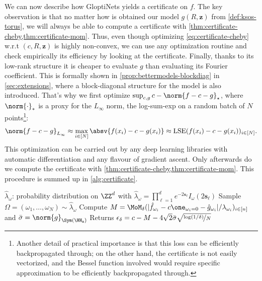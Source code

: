 \documentclass{article}
\begin{document}
We can now describe how GloptiNets yields a certificate on $f$. The key observation is that no matter how is obtained our model $g(R, \mathbf{z})$ from \cref{def:ksos-torus}, we will always be able to compute a certificate with \cref{thm:certificate-cheby,thm:certificate-mom}. Thus, even though optimizing \cref{eq:certificate-cheby} w.r.t $(c, R, \mathbf{z})$ is highly non-convex, we can use any optimization routine and check empirically its efficiency by looking at the certificate.
Finally, thanks to its low-rank structure it is cheaper to evaluate $g$ than evaluating its Fourier coefficient. This is formally shown in \cref{prop:bettermodels-blockdiag} in \cref{sec:extensions}, where a block-diagonal structure for the model is also introduced. That's why we first optimize $\sup_{c, g} c - \norm{f - c - g}_\star$, where $\norm{\cdot}_*$ is a proxy for the $L_\infty$ norm, \eg the log-sum-exp on a random batch of $N$ points\footnote{Another detail of practical importance is that this loss can be efficiently backpropagated through; on the other hand, the certificate is not easily vectorized, and the Bessel function involved would require specific approximation to be efficiently backpropagated through.}:
\begin{equation}
  \norm{f - c - g}_{L_\infty} \approx \max_{i \in [N]} \absv{f(x_i) - c - g(x_i)} \approx \mathrm{LSE} (f(x_i) - c - g(x_i))_{i \in [N]}.
\end{equation}
This optimization can be carried out by any deep learning libraries with automatic differentiation and any flavour of gradient ascent. Only afterwards do we compute the certificate with \cref{thm:certificate-cheby,thm:certificate-mom}. This procedure is summed up in \cref{alg:certificate}.

\begin{algorithm}\label{alg:certificate}
  \caption{GloptiNets}




  $\hat{\lambda}_\omega$: probability distribution on $\ZZ^d$ with $\hat{\lambda}_\omega = \prod_{\ell = 1}^d e^{-2 \mathbf{s}_\ell} I_\omega(2 \mathbf{s}_\ell)$\;
    Sample $\Omega = (\omega_1, \dots, \omega_N) \sim \hat{\lambda}_\omega$ \;
    Compute $M = \MoM_\delta(|\hat{f}_{\omega_i} - c \one_{\omega_i = 0} - \hat{g}_{\omega_i}| / \lambda_{\omega_i})_{i \in [n]}$ and $\bar{\sigma} = \norm{g}_{\Sym(\HH_{\mathbf{s}})}$\;
    Returns $\epsilon_\delta = c - M - 4\sqrt{2} \bar{\sigma} \sqrt{\nicefrac{\log(1/\delta)}{N}}$\;
\end{algorithm}
\end{document}
